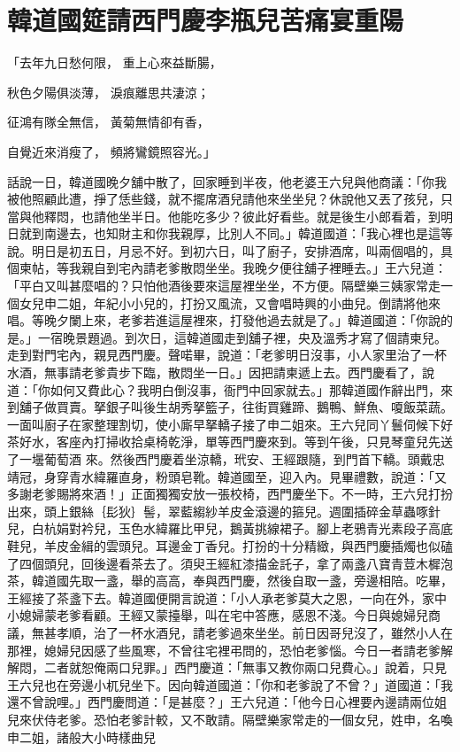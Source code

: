 %

\chapter{韓道國筵請西門慶\KG 李瓶兒苦痛宴重陽}

「去年九日愁何限，  重上心來益斷腸，

秋色夕陽俱淡薄，  淚痕離思共淒涼；

征鴻有隊全無信，  黃菊無情卻有香，

自覺近來消瘦了，  頻將鸞鏡照容光。」

話說一日，韓道國晚夕舖中散了，回家睡到半夜，他老婆王六兒與他商議：「你我被他照顧此遭，掙了恁些錢，就不擺席酒兒請他來坐坐兒？休說他又丟了孩兒，只當與他釋悶，也請他坐半日。他能吃多少？彼此好看些。就是後生小郎看着，到明日就到南邊去，也知財主和你我親厚，比別人不同。」韓道國道：「我心裡也是這等說。明日是初五日，月忌不好。到初六日，叫了廚子，安排酒席，叫兩個唱的，具個柬帖，等我親自到宅內請老爹散悶坐坐。我晚夕便往舖子裡睡去。」王六兒道：「平白又叫甚麼唱的？只怕他酒後要來這屋裡坐坐，不方便。隔壁樂三姨家常走一個女兒申二姐，年紀小小兒的，打扮又風流，又會唱時興的小曲兒。倒請將他來唱。等晚夕闌上來，老爹若進這屋裡來，打發他過去就是了。」韓道國道：「你說的是。」一宿晚景題過。到次日，這韓道國走到舖子裡，央及溫秀才寫了個請柬兒。走到對門宅內，親見西門慶。聲喏畢，說道：「老爹明日沒事，小人家里治了一杯水酒，無事請老爹貴步下臨，散悶坐一日。」因把請柬遞上去。西門慶看了，說道：「你如何又費此心？我明白倒沒事，衙門中回家就去。」那韓道國作辭出門，來到舖子做買賣。拏銀子叫後生胡秀拏籃子，往街買雞蹄、鵝鴨、鮮魚、嗄飯菜蔬。一面叫廚子在家整理割切，使小廝早拏轎子接了申二姐來。王六兒同丫鬟伺候下好茶好水，客座內打掃收拾桌椅乾淨，單等西門慶來到。等到午後，只見琴童兒先送了一壜葡萄酒 來。然後西門慶着坐涼轎，玳安、王經跟隨，到門首下轎。頭戴忠靖冠，身穿青水緯羅直身，粉頭皂靴。韓道國至，迎入內。見畢禮數，說道：「又多謝老爹賜將來酒！」正面獨獨安放一張校椅，西門慶坐下。不一時，王六兒打扮出來，頭上銀絲｛髟狄｝髻，翠藍縐紗羊皮金滾邊的箍兒。週圍插碎金草蟲啄針兒，白杭娟對衿兒，玉色水緯羅比甲兒，鵝黃挑線裙子。腳上老鴉青光素段子高底鞋兒，羊皮金緝的雲頭兒。耳邊金丁香兒。打扮的十分精緻，與西門慶插燭也似磕了四個頭兒，回後邊看茶去了。須臾王經紅漆描金託子，拿了兩盞八寶青荳木樨泡茶，韓道國先取一盞，舉的高高，奉與西門慶，然後自取一盞，旁邊相陪。吃畢，王經接了茶盞下去。韓道國便開言說道：「小人承老爹莫大之恩，一向在外，家中小媳婦蒙老爹看顧。王經又蒙擡舉，叫在宅中答應，感恩不淺。今日與媳婦兒商議，無甚孝順，治了一杯水酒兒，請老爹過來坐坐。前日因哥兒沒了，雖然小人在那裡，媳婦兒因感了些風寒，不曾往宅裡弔問的，恐怕老爹惱。今日一者請老爹解解悶，二者就恕俺兩口兒罪。」西門慶道：「無事又教你兩口兒費心。」說着，只見王六兒也在旁邊小杌兒坐下。因向韓道國道：「你和老爹說了不曾？」道國道：「我還不曾說哩。」西門慶問道：「是甚麼？」王六兒道：「他今日心裡要內邊請兩位姐兒來伏侍老爹。恐怕老爹計較，又不敢請。隔壁樂家常走的一個女兒，姓申，名喚申二姐，諸般大小時樣曲兒